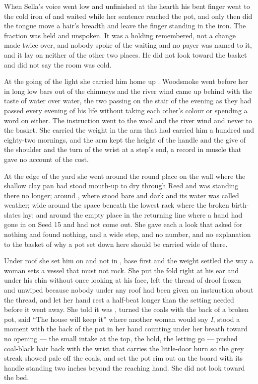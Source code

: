 When Sella's voice went low and unfinished at the hearth his bent finger went to the cold iron of  and waited while her sentence reached the pot, and only then did the tongue move a hair's breadth and leave the finger standing in the iron. The fraction was held and unspoken. It was a holding remembered, not a change made twice over, and nobody spoke of the waiting and no payer was named to it, and it lay on neither of the other two places. He did not look toward the basket and did not say the room was cold.

\scenebreak

At the going of the light she carried him home up . Woodsmoke went before her in long low bars out of the chimneys and the river wind came up behind with the taste of water over water, the two passing on the stair of the evening as they had passed every evening of his life without taking each other's colour or spending a word on either. The instruction went to the wool and the river wind and never to the basket. She carried the weight in the arm that had carried him a hundred and eighty-two mornings, and the arm kept the height of the handle and the give of the shoulder and the turn of the wrist at a step's end, a record in muscle that gave no account of the cost.

At the edge of the yard she went around the round place on the wall where the shallow clay pan had stood mouth-up to dry through Reed and was standing there no longer; around , where  stood bare and dark and its water was called weather; wide around the space beneath the lowest rack where the broken birth-slates lay; and around the empty place in the returning line where a hand had gone in on Seed 15 and had not come out. She gave each a look that asked for nothing and found nothing, and a wide step, and no number, and no explanation to the basket of why a pot set down here should be carried wide of there.

\scenebreak

Under  roof she set him on  and not in , base first and the weight settled the way a woman sets a vessel that must not rock. She put the fold right at his ear and under his chin without once looking at his face, left the thread of drool frozen and unwiped because nobody under any roof had been given an instruction about the thread, and let her hand rest a half-beat longer than the setting needed before it went away. She told  it was , turned the coals with the back of a broken pot, said “The house will keep it” where another woman would say \emph{I}, stood a moment with the back of the pot in her hand counting under her breath toward no opening --- the small intake at the top, the hold, the letting go --- pushed coal-black hair back with the wrist that carries the little-door burn so the grey streak showed pale off the coals, and set the pot rim out on the board with its handle standing two inches beyond the reaching hand. She did not look toward the bed.

